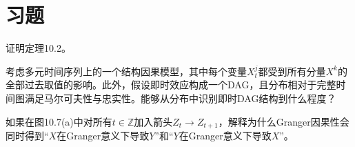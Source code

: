 \section{习题}
\setcounter{problem}{7}
\begin{problem}[无环汇总图]
证明定理10.2。
\end{problem}

\begin{problem}[即时效应]
考虑多元时间序列上的一个结构因果模型，其中每个变量$X_t^j$都受到所有分量$X^k$的全部过去取值的影响。此外，假设即时效应构成一个DAG，且分布相对于完整时间图满足马尔可夫性与忠实性。能够从分布中识别即时DAG结构到什么程度？
\end{problem}

\begin{problem}[Granger因果性]
如果在图10.7(a)中对所有$t\in\mathbb Z$加入箭头$Z_t\to Z_{t+1}$，解释为什么Granger因果性会同时得到“$X$在Granger意义下导致$Y$”和“$Y$在Granger意义下导致$X$”。
\end{problem}
